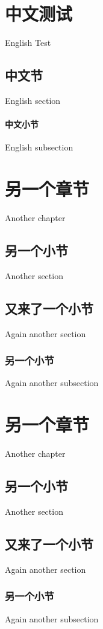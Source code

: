 \documentclass[openany,12pt]{ctexbook} %
\begin{document}
\frontmatter

\pagestyle{plain}
\begin{spacing}{1.7}
%	
%	
%	
		\newpage

	\tableofcontents
\end{spacing}

\pagestyle{fancy}

\mainmatter  \xiaosi
\chapter{中文测试}{English Test}
\section{中文节}{English section}
\subsubsection{中文小节}{English subsection}
\chapter{另一个章节}{Another chapter}
\section{另一个小节}{Another section}
\section{又来了一个小节}{Again another section}
\subsection{另一个小节}{Again another subsection}
\chapter*{另一个章节}{Another chapter}
\section*{另一个小节}{Another section}
\section*{又来了一个小节}{Again another section}
\subsection*{另一个小节}{Again another subsection}
\end{document}
